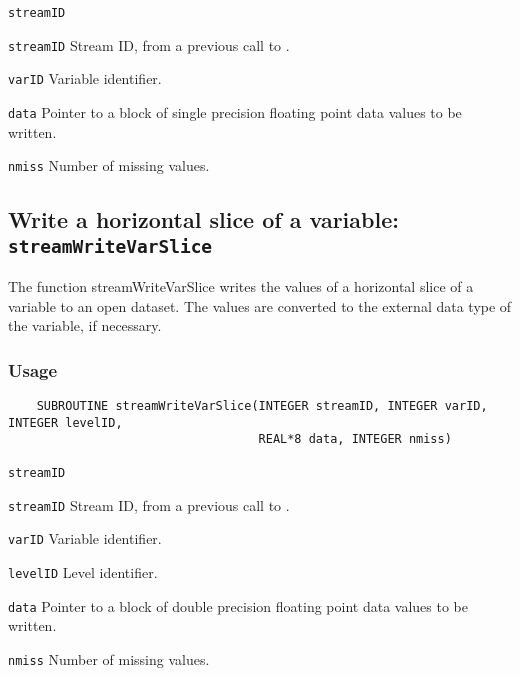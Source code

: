 \hspace*{4mm}\begin{minipage}[]{15cm}
\begin{deflist}{\texttt{streamID}\ }
\item[\texttt{streamID}]
Stream ID, from a previous call to {}.
\item[\texttt{varID}]
Variable identifier.
\item[\texttt{data}]
Pointer to a block of single precision floating point data values to be written.
\item[\texttt{nmiss}]
Number of missing values.

\end{deflist}
\end{minipage}


\subsection{Write a horizontal slice of a variable: \texttt{streamWriteVarSlice}}
\label{streamWriteVarSlice}

The function streamWriteVarSlice writes the values of a horizontal slice of a variable to an open dataset.
The values are converted to the external data type of the variable, if necessary.
\subsubsection*{Usage}

\begin{verbatim}
    SUBROUTINE streamWriteVarSlice(INTEGER streamID, INTEGER varID, INTEGER levelID, 
                                   REAL*8 data, INTEGER nmiss)
\end{verbatim}

\hspace*{4mm}\begin{minipage}[]{15cm}
\begin{deflist}{\texttt{streamID}\ }
\item[\texttt{streamID}]
Stream ID, from a previous call to {}.
\item[\texttt{varID}]
Variable identifier.
\item[\texttt{levelID}]
Level identifier.
\item[\texttt{data}]
Pointer to a block of double precision floating point data values to be written.
\item[\texttt{nmiss}]
Number of missing values.

\end{deflist}
\end{minipage}


